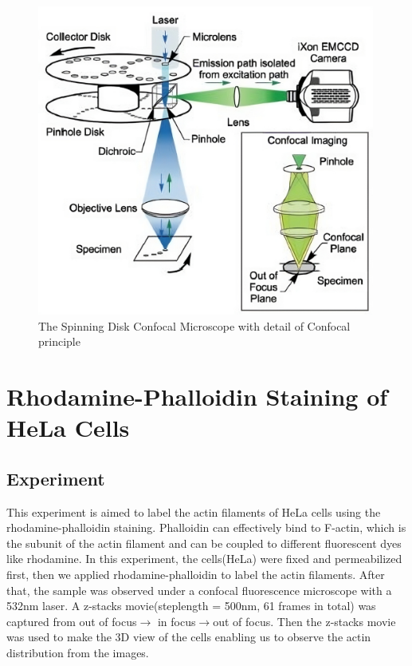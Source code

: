 \documentclass[a4paper,english,12pt,bibliography=totoc]{scrreprt}
\begin{document}
\begin{figure}[H]
    \centering
    \includegraphics[width=0.99\textwidth]{Images/Spinning Disk Confocal Setup.jpeg}
    \caption{The Spinning Disk Confocal Microscope with detail of Confocal principle\cite{Spinning_disk}}
    \label{fig:enter-label}
\end{figure}





\chapter{Rhodamine-Phalloidin Staining of HeLa Cells}
\label{cha:Experiment1}
\section{Experiment}
This experiment is aimed to label the actin filaments of HeLa cells using the rhodamine-phalloidin staining. Phalloidin can effectively bind to F-actin, which is the subunit of the actin filament and can be coupled to different fluorescent dyes like rhodamine. In this experiment, the cells(HeLa) were fixed and permeabilized first, then we applied rhodamine-phalloidin to label the actin filaments. After that, the sample was observed under a confocal fluorescence microscope with a 532nm laser. A z-stacks movie(steplength = 500nm, 61 frames in total) was captured from out of focus$\xrightarrow{}$ in focus$\xrightarrow{}$out of focus. Then the z-stacks movie was used to make the 3D view of the cells enabling us to observe the actin distribution from the images.
\end{document}
